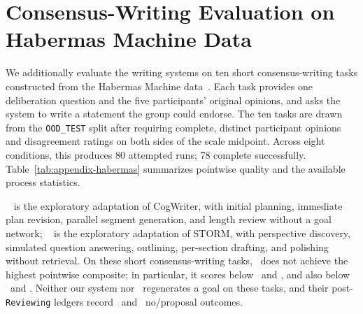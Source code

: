 \section{Consensus-Writing Evaluation on Habermas Machine Data}
\label{app:habermas}
We additionally evaluate the writing systems on ten short consensus-writing tasks constructed from the Habermas Machine data~\citep{tessler2024common}.
Each task provides one deliberation question and the five participants' original opinions, and asks the system to write a statement the group could endorse.
The ten tasks are drawn from the \texttt{OOD\_TEST} split after requiring complete, distinct participant opinions and disagreement ratings on both sides of the scale midpoint.
Across eight conditions, this produces 80 attempted runs; 78 complete successfully.
Table~\ref{tab:appendix-habermas} summarizes pointwise quality and the available process statistics.


\condExploratoryOne~\citep{wan2025cognitive} is the exploratory adaptation of CogWriter, with initial planning, immediate plan revision, parallel segment generation, and length review without a goal network; \condExploratoryTwo~\citep{shao2024assisting} is the exploratory adaptation of STORM, with perspective discovery, simulated question answering, outlining, per-section drafting, and polishing without retrieval.
On these short consensus-writing tasks, \condAgenticCogWriter\ does not achieve the highest pointwise composite; in particular, it scores below \condSinglePass\ and \condStaged, and also below \condNoGoals\ and \condFixedOrder.
Neither our system nor \condFixedOrder\ regenerates a goal on these tasks, and their post-\texttt{Reviewing} ledgers record \HabAfourLedger\ and \HabAsixLedger\ no/proposal outcomes.
